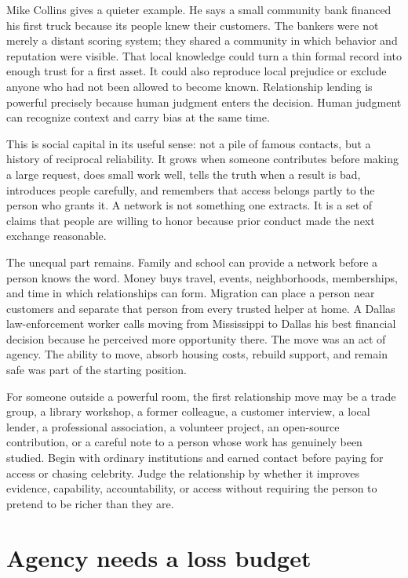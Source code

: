Mike Collins gives a quieter example. He says a small community bank financed
his first truck because its people knew their customers. The bankers were not
merely a distant scoring system; they shared a community in which behavior and
reputation were visible. That local knowledge could turn a thin formal record
into enough trust for a first asset. It could also reproduce local prejudice or
exclude anyone who had not been allowed to become known. Relationship lending
is powerful precisely because human judgment enters the decision. Human
judgment can recognize context and carry bias at the same time.

This is social capital in its useful sense: not a pile of famous contacts, but
a history of reciprocal reliability. It grows when someone contributes before
making a large request, does small work well, tells the truth when a result is
bad, introduces people carefully, and remembers that access belongs partly to
the person who grants it. A network is not something one extracts. It is a set
of claims that people are willing to honor because prior conduct made the next
exchange reasonable.

The unequal part remains. Family and school can provide a network before a
person knows the word. Money buys travel, events, neighborhoods, memberships,
and time in which relationships can form. Migration can place a person near
customers and separate that person from every trusted helper at home. A Dallas
law-enforcement worker calls moving from Mississippi to Dallas his best
financial decision because he perceived more opportunity there. The move was
an act of agency. The ability to move, absorb housing costs, rebuild support,
and remain safe was part of the starting position.

For someone outside a powerful room, the first relationship move may be a trade
group, a library workshop, a former colleague, a customer interview, a local
lender, a professional association, a volunteer project, an open-source
contribution, or a careful note to a person whose work has genuinely been
studied. Begin with ordinary institutions and earned contact before paying for
access or chasing celebrity. Judge the relationship by whether it improves
evidence, capability,
accountability, or access without requiring the person to pretend to be richer
than they are.

\section{Agency needs a loss budget}

